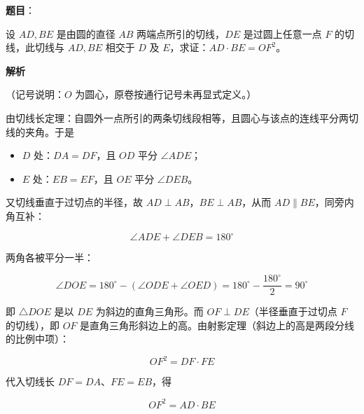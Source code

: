 \begin{answer}

\textbf{题目}：

设 $AD,BE$ 是由圆的直径 $AB$ 两端点所引的切线，$DE$ 是过圆上任意一点 $F$ 的切线，此切线与 $AD,BE$ 相交于 $D$ 及 $E$，求证：$AD\cdot BE=OF^2$。

\textbf{解析}

（记号说明：$O$ 为圆心，原卷按通行记号未再显式定义。）

由切线长定理：自圆外一点所引的两条切线段相等，且圆心与该点的连线平分两切线的夹角。于是

\begin{itemize}
\item $D$ 处：$DA=DF$，且 $OD$ 平分 $\angle ADE$；
\item $E$ 处：$EB=EF$，且 $OE$ 平分 $\angle DEB$。
\end{itemize}

又切线垂直于过切点的半径，故 $AD\perp AB$，$BE\perp AB$，从而 $AD\parallel BE$，同旁内角互补：

\nopagebreak[4]
\[
\angle ADE+\angle DEB=180^\circ
\]

两角各被平分一半：

\nopagebreak[4]
\[
\angle DOE=180^\circ-(\angle ODE+\angle OED)=180^\circ-\frac{180^\circ}{2}=90^\circ
\]

即 $\triangle DOE$ 是以 $DE$ 为斜边的直角三角形。而 $OF\perp DE$（半径垂直于过切点 $F$ 的切线），即 $OF$ 是直角三角形斜边上的高。由射影定理（斜边上的高是两段分线的比例中项）：

\nopagebreak[4]
\[
OF^2=DF\cdot FE
\]

代入切线长 $DF=DA$、$FE=EB$，得

\nopagebreak[4]
\[
OF^2=AD\cdot BE
\]


\end{answer}
